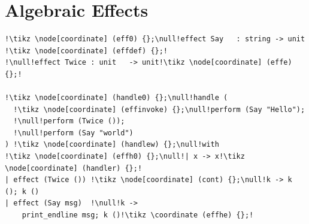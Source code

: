 \documentclass[unicode,compress,14pt,CJK%
\directlua{
    handout = os.getenv"HANDOUT"
    local _ = handout and tex.print(",handout")
},t]{beamer}
\begin{document}
\section{Algebraic Effects}
\newsavebox{\lstbox}
\begin{lrbox}{\lstbox}
    \begin{lstlisting}
!\tikz \node[coordinate] (eff0) {};\null!effect Say   : string -> unit !\tikz \node[coordinate] (effdef) {};!
!\null!effect Twice : unit   -> unit!\tikz \node[coordinate] (effe) {};!

!\tikz \node[coordinate] (handle0) {};\null!handle (
  !\tikz \node[coordinate] (effinvoke) {};\null!perform (Say "Hello");
  !\null!perform (Twice ());
  !\null!perform (Say "world")
) !\tikz \node[coordinate] (handlew) {};\null!with
!\tikz \node[coordinate] (effh0) {};\null!| x -> x!\tikz \node[coordinate] (handler) {};!
| effect (Twice ()) !\tikz \node[coordinate] (cont) {};\null!k -> k (); k ()
| effect (Say msg)  !\null!k ->
    print_endline msg; k ()!\tikz \coordinate (effhe) {};!
    \end{lstlisting}
\end{lrbox}
\end{document}
